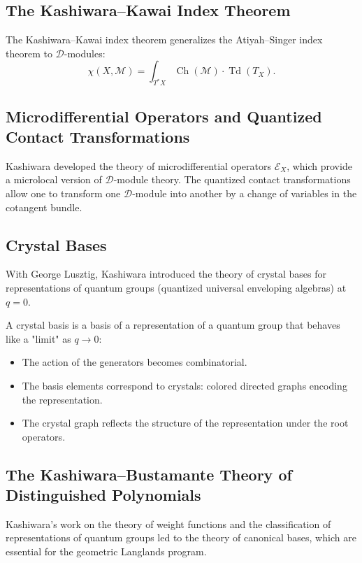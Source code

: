 \subsection{The Kashiwara--Kawai Index Theorem}

The Kashiwara--Kawai index theorem generalizes the Atiyah--Singer index theorem to $\mathcal{D}$-modules:
\[
\chi(X, \mathcal{M}) = \int_{T^*X} \operatorname{Ch}(\mathcal{M}) \cdot \operatorname{Td}(T_X).
\]

\subsection{Microdifferential Operators and Quantized Contact Transformations}

Kashiwara developed the theory of microdifferential operators $\mathcal{E}_X$, which provide a microlocal version of $\mathcal{D}$-module theory. The quantized contact transformations allow one to transform one $\mathcal{D}$-module into another by a change of variables in the cotangent bundle.

\subsection{Crystal Bases}

With George Lusztig, Kashiwara introduced the theory of crystal bases for representations of quantum groups (quantized universal enveloping algebras) at $q = 0$.

A crystal basis is a basis of a representation of a quantum group that behaves like a "limit" as $q \to 0$:
\begin{itemize}
\item The action of the generators becomes combinatorial.
\item The basis elements correspond to crystals: colored directed graphs encoding the representation.
\item The crystal graph reflects the structure of the representation under the root operators.
\end{itemize}

\subsection{The Kashiwara--Bustamante Theory of Distinguished Polynomials}

Kashiwara's work on the theory of weight functions and the classification of representations of quantum groups led to the theory of canonical bases, which are essential for the geometric Langlands program.

